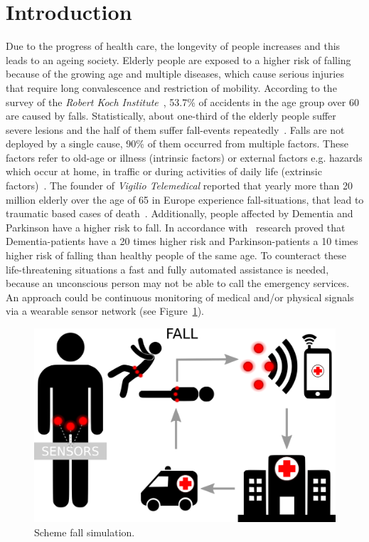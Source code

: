 \documentclass[conference]{IEEEtran}
\theoremstyle{definition}
\begin{document}
\IEEEpeerreviewmaketitle

\section{Introduction}

Due to the progress of health care, the longevity of people increases and this leads to an ageing society. Elderly people are exposed 
to a higher risk of falling because of the growing age and multiple diseases, which cause serious injuries that require long convalescence 
and restriction of mobility. According to the survey of the \textit{Robert Koch Institute}~\cite{Varnaccia2013}, 53.7\% of accidents in the age 
group over 60 are caused by falls. Statistically, about one-third of the elderly people suffer severe lesions and the half of them suffer 
fall-events repeatedly~\cite{Schott2008}. Falls are not deployed by a single cause, 90\% of them occurred from multiple factors. These 
factors refer to old-age or illness (intrinsic factors) or external factors e.g. hazards which occur at home, in traffic or during activities 
of daily life (extrinsic factors)~\cite{Schott2008}. The founder of \textit{Vigilio Telemedical} reported that yearly more than 20 million 
elderly over the age of 65 in Europe experience fall-situations, that lead to traumatic based cases of death~\cite{Vigilio,APAOTS2013}. 
Additionally, people affected by Dementia and Parkinson have a higher risk to fall. In accordance with~\cite{Monks} research proved that 
Dementia-patients have a 20 times higher risk and Parkinson-patients a 10 times higher risk of falling than healthy people of the same age. 
To counteract these life-threatening situations a fast and fully automated assistance is needed, because an unconscious person may not be 
able to call the emergency services. An approach could be continuous monitoring of medical and/or physical signals via a wearable sensor 
network (see Figure~\ref{fig:simulation}). 

\begin{figure}[!h]
  \centering
  \includegraphics[scale=0.2]{img/Figure1}
  \caption[Escalation scheme]{Scheme fall simulation.}
  \label{fig:simulation}
\end{figure}
\end{document}
